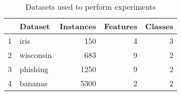 \begin{table}
\footnotesize
\caption{Datasets used to perform experiments}
\label{tab:datasets}
\begin{tabular}{llrrr}
\hline
 & Dataset & Instances & Features & Classes \\
\hline
1 & iris & 150 & 4 & 3 \\
2 & wisconsin & 683 & 9 & 2 \\
3 & phishing & 1250 & 9 & 2 \\
4 & bananas & 5300 & 2 & 2 \\
\hline
\end{tabular}
\end{table}
